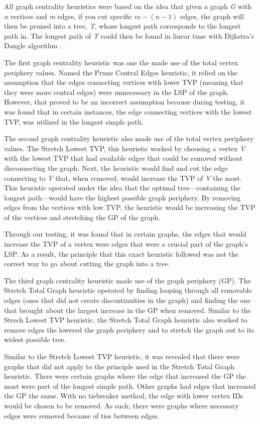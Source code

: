 \documentclass[twocolumn,showpacs,%
  nofootinbib,aps,superscriptaddress,%
  eqsecnum,prd,notitlepage,showkeys,11pt]{article}
\begin{document}
All graph centrality heuristics were based on the idea that given a graph \emph{G} with \emph{n} vertices and \emph{m} edges, if you cut specific \(m - (n - 1)\) edges, the graph will then be pruned into a tree, \emph{T}, whose longest path corresponds to the longest path in. The longest path of \emph{T} could then be found in linear time with Dijkstra's Dangle algorithm \cite{club2002computing}.

The first graph centrality heuristic was one the made use of the total vertex periphery values. Named the Prune Central Edges heuristic, it relied on the assumption that the edges connecting vertices with lower TVP (meaning that they were more central edges) were unnecessary in the LSP of the graph. However, that proved to be an incorrect assumption because during testing, it was found that in certain instances, the edge connecting vertices with the lowest TVP, was utilized in the longest simple path.

The second graph centrality heuristic also made use of the total vertex periphery values. The Stretch Lowest TVP, this heuristic worked by choosing a vertex \emph{V} with the lowest TVP that had available edges that could be removed without disconnecting the graph. Next, the heuristic would find and cut the edge connecting to \emph{V} that, when removed, would increase the TVP of \emph{V} the most. This heuristic operated under the idea that the optimal tree---containing the longest path---would have the highest possible graph periphery. By removing edges from the vertices with low TVP, the heuristic would be increasing the TVP of the vertices and stretching the GP of the graph.

Through our testing, it was found that in certain graphs, the edges that would increase the TVP of a vertex were edges that were a crucial part of the graph's LSP. As a result, the principle that this exact heuristic followed was not the correct way to go about cutting the graph into a tree.

The third graph centrality heuristic made use of the graph periphery (GP). The Stretch Total Graph heuristic operated by finding looping through all removable edges (ones that did not create discontinuities in the graph) and finding the one that brought about the largest increase in the GP when removed. Similar to the Strech Lowest TVP heuristic, the Stretch Total Graph heuristic also worked to remove edges the lowered the graph periphery and to stretch the graph out to its widest possible tree. 

Similar to the Stretch Lowest TVP heuristic, it was revealed that there were graphs that did not apply to the principle used in the Stretch Total Graph heuristic. There were certain graphs where the edge that increased the GP the most were part of the longest simple path. Other graphs had edges that increased the GP the same. With no tiebreaker method, the edge with lower vertex IDs would be chosen to be removed. As such, there were graphs where necessary edges were removed because of ties between edges.
\end{document}
